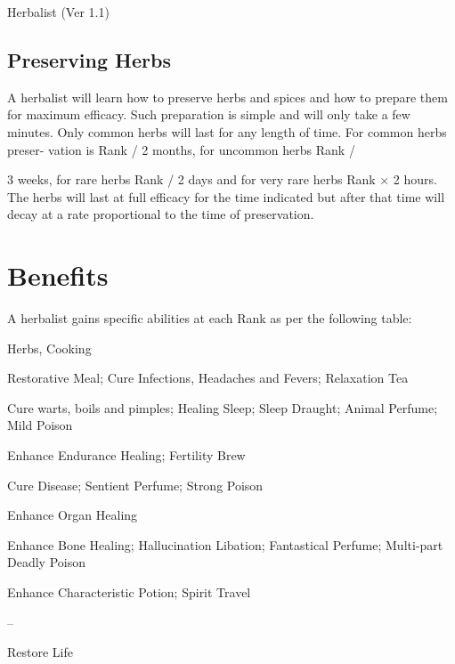 \begin{Chapter}{Herbalist (Ver 1.1)}
\subsection{Preserving Herbs}

A herbalist will learn how to preserve herbs and spices and how to
prepare them for maximum efficacy.  Such preparation is simple and
will only take a few minutes.  Only common herbs will last for any
length of time.  For common herbs preser- vation is Rank / 2 months,
for uncommon herbs Rank /

3 weeks, for rare herbs Rank / 2 days and for very rare herbs Rank × 2
hours.  The herbs will last at full efficacy for the time indicated
but after that time will decay at a rate proportional to the time of
preservation.

\section{Benefits}

A herbalist gains specific abilities at each Rank as 
per the following table: 

\begin{Enumerate}\setcounter{enumi}{-1}
\item Herbs, Cooking

\item Restorative Meal; Cure Infections, Headaches and Fevers;
  Relaxation Tea

\item Cure warts, boils and pimples; Healing Sleep; Sleep Draught;
  Animal Perfume; Mild Poison

\item Enhance Endurance Healing; Fertility Brew

\item Cure Disease;
  Sentient Perfume; Strong Poison 

\item Enhance Organ Healing

\item Enhance Bone Healing; Hallucination Libation; Fantastical
  Perfume; Multi-part Deadly Poison

\item Enhance Characteristic Potion; Spirit Travel

\item   – 

\item Restore Life

\end{Enumerate}


\end{Chapter}
